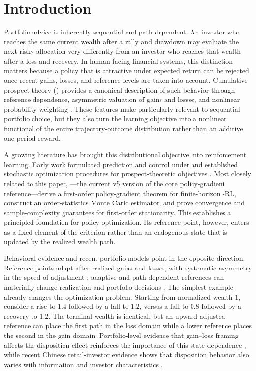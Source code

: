 \section{Introduction}\label{sec:introduction}

Portfolio advice is inherently sequential and path dependent.  An investor who reaches the same current wealth after a rally and drawdown may evaluate the next risky allocation very differently from an investor who reaches that wealth after a loss and recovery.  In human-facing financial systems, this distinction matters because a policy that is attractive under expected return can be rejected once recent gains, losses, and reference levels are taken into account.  Cumulative prospect theory (\CPT) provides a canonical description of such behavior through reference dependence, asymmetric valuation of gains and losses, and nonlinear probability weighting \citep{kahneman1979prospect,tversky1992advances}.  These features make \CPT particularly relevant to sequential portfolio choice, but they also turn the learning objective into a nonlinear functional of the entire trajectory-outcome distribution rather than an additive one-period reward.

A growing literature has brought this distributional objective into reinforcement learning.  Early work formulated prediction and control under \CPT and established stochastic optimization procedures for prospect-theoretic objectives \citep{prashanth2016cumulative,jie2018stochastic}.  Most closely related to this paper, \citet{lepel2026policygradients}---the current v5 version of the core \CPT policy-gradient reference---derive a first-order policy-gradient theorem for finite-horizon \CPT-RL, construct an order-statistics Monte Carlo estimator, and prove convergence and sample-complexity guarantees for first-order stationarity.  This establishes a principled foundation for \CPT policy optimization.  Its reference point, however, enters as a fixed element of the \CPT criterion rather than an endogenous state that is updated by the realized wealth path.

Behavioral evidence and recent portfolio models point in the opposite direction.  Reference points adapt after realized gains and losses, with systematic asymmetry in the speed of adjustment \citep{arkes2008reference,arkes2010cross}; adaptive and path-dependent references can materially change realization and portfolio decisions \citep{he2019realization,qin2022realization,gao2024multiperiod}.  The simplest example already changes the optimization problem.  Starting from normalized wealth $1$, consider a rise to $1.4$ followed by a fall to $1.2$, versus a fall to $0.8$ followed by a recovery to $1.2$.  The terminal wealth is identical, but an upward-adjusted reference can place the first path in the loss domain while a lower reference places the second in the gain domain.  Portfolio-level evidence that gain--loss framing affects the disposition effect reinforces the importance of this state dependence \citep{an2024portfolio}, while recent Chinese retail-investor evidence shows that disposition behavior also varies with information and investor characteristics \citep{chen2025xueqiu}.

